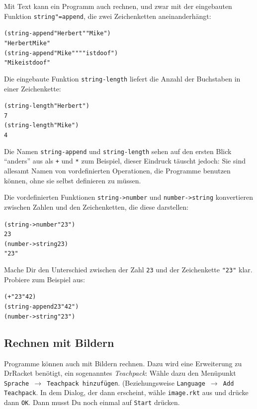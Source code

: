 Mit Text kann ein Programm auch rechnen, und zwar mit der eingebauten
Funktion
\texttt{string"=append},
die zwei Zeichenketten aneinanderhängt:
%
\begin{alltt}
(string-append "Herbert" "Mike")
\evalsto{} "HerbertMike"
(string-append "Mike" " " "ist doof")
\evalsto{} "Mike ist doof"
\end{alltt}
%
Die eingebaute Funktion
\texttt{string-length}
liefert die Anzahl der Buchstaben in einer Zeichenkette:
%
\begin{alltt}
(string-length "Herbert")
\evalsto{} 7
(string-length "Mike")
\evalsto{} 4
\end{alltt}
%
Die Namen \texttt{string-append} und \texttt{string-length} sehen auf
den ersten Blick "`anders"' aus als \texttt{+} und \texttt{*} zum
Beispiel, dieser Eindruck täuscht jedoch: Sie sind allesamt Namen von
vordefinierten Operationen, die Programme benutzen können, ohne sie
selbst definieren zu müssen.

Die vordefinierten Funktionen
\texttt{string->number}
und \texttt{number->string} konvertieren zwischen Zahlen und den
Zeichenketten, die diese darstellen:
%
\begin{alltt}
(string->number "23")
\evalsto{} 23
(number->string 23)
\evalsto{} "23"
\end{alltt}
%
\begin{aufgabe}
  Mache Dir den Unterschied zwischen der Zahl \texttt{23} und der
  Zeichenkette \verb|"23"| klar.  Probiere zum Beispiel aus:
\begin{alltt}
(+ "23" 42)
(string-append 23 "42")
(number->string "23")
\end{alltt}
\end{aufgabe}

\subsection{Rechnen mit Bildern}

Programme können auch mit Bildern rechnen.  Dazu wird eine Erweiterung
zu DrRacket benötigt, ein sogenanntes
\textit{Teachpack}: Wähle dazu den Menüpunkt
\texttt{Sprache $\rightarrow$ Teachpack hinzufügen}.  (Beziehungsweise
\texttt{Language $\rightarrow$ Add Teachpack}.  In dem Dialog, der
dann erscheint, wähle \texttt{image.rkt} aus und drücke dann
\texttt{OK}.  Dann musst Du noch einmal auf \texttt{Start} drücken.

